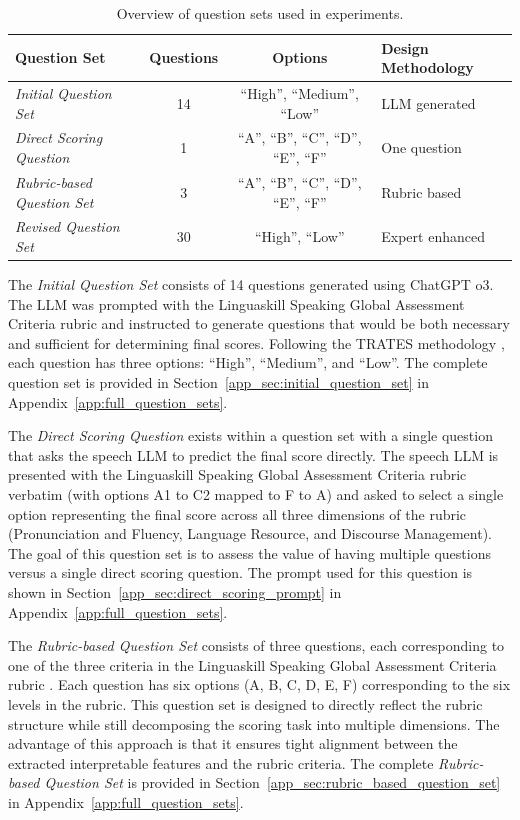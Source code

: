 \documentclass{report}
\begin{document}
\begin{table}[h]
\centering
\begin{tabular}{|l|c|c|l|}
\hline
\textbf{Question Set} & \textbf{Questions} & \textbf{Options} & \textbf{Design Methodology} \\
\hline
\emph{Initial Question Set} & 14 & ``High'', ``Medium'', ``Low'' & LLM generated \\
\hline
\emph{Direct Scoring Question} & 1 & ``A'', ``B'', ``C'', ``D'', ``E'', ``F'' & One question \\
\hline
\emph{Rubric-based Question Set} & 3 & ``A'', ``B'', ``C'', ``D'', ``E'', ``F'' & Rubric based \\
\hline
\emph{Revised Question Set} & 30 & ``High'', ``Low'' & Expert enhanced \\
\hline
\end{tabular}
\caption{Overview of question sets used in experiments.}
\label{table:question_sets}
\end{table}

The \emph{Initial Question Set} consists of 14 questions generated using ChatGPT o3. The LLM was prompted with the Linguaskill Speaking Global Assessment Criteria rubric \citep{cambridge2020linguaskill} and instructed to generate questions that would be both necessary and sufficient for determining final scores. Following the TRATES methodology \citep{eltanbouly2025tratestraitspecificrubricassistedcrossprompt}, each question has three options: ``High'', ``Medium'', and ``Low''. The complete question set is provided in Section~\ref{app_sec:initial_question_set} in Appendix~\ref{app:full_question_sets}.

The \emph{Direct Scoring Question} exists within a question set with a single question that asks the speech LLM to predict the final score directly. The speech LLM is presented with the Linguaskill Speaking Global Assessment Criteria rubric \citep{cambridge2020linguaskill} verbatim (with options A1 to C2 mapped to F to A) and asked to select a single option representing the final score across all three dimensions of the rubric (Pronunciation and Fluency, Language Resource, and Discourse Management). The goal of this question set is to assess the value of having multiple questions versus a single direct scoring question. The prompt used for this question is shown in Section~\ref{app_sec:direct_scoring_prompt} in Appendix~\ref{app:full_question_sets}.

The \emph{Rubric-based Question Set} consists of three questions, each corresponding to one of the three criteria in the Linguaskill Speaking Global Assessment Criteria rubric \citep{cambridge2020linguaskill}. Each question has six options (A, B, C, D, E, F) corresponding to the six levels in the rubric. This question set is designed to directly reflect the rubric structure while still decomposing the scoring task into multiple dimensions. The advantage of this approach is that it ensures tight alignment between the extracted interpretable features and the rubric criteria. The complete \emph{Rubric-based Question Set} is provided in Section~\ref{app_sec:rubric_based_question_set} in Appendix~\ref{app:full_question_sets}.
\end{document}

